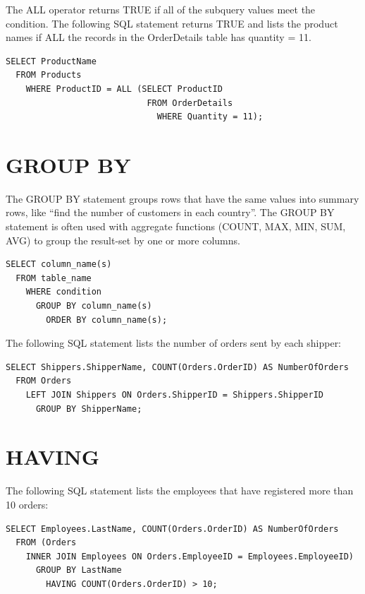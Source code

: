 \documentclass[
]{book}
\begin{document}
The ALL operator returns TRUE if all of the subquery values meet the condition. The following SQL statement returns TRUE and lists the product names if ALL the records in the OrderDetails table has quantity = 11.

\begin{verbatim}
SELECT ProductName
  FROM Products
    WHERE ProductID = ALL (SELECT ProductID 
                            FROM OrderDetails 
                              WHERE Quantity = 11);
\end{verbatim}

\hypertarget{group-by}{%
\section{GROUP BY}\label{group-by}}

The GROUP BY statement groups rows that have the same values into summary rows, like ``find the number of customers in each country''. The GROUP BY statement is often used with aggregate functions (COUNT, MAX, MIN, SUM, AVG) to group the result-set by one or more columns.

\begin{verbatim}
SELECT column_name(s)
  FROM table_name
    WHERE condition
      GROUP BY column_name(s)
        ORDER BY column_name(s);
\end{verbatim}

The following SQL statement lists the number of orders sent by each shipper:

\begin{verbatim}
SELECT Shippers.ShipperName, COUNT(Orders.OrderID) AS NumberOfOrders 
  FROM Orders
    LEFT JOIN Shippers ON Orders.ShipperID = Shippers.ShipperID
      GROUP BY ShipperName;
\end{verbatim}

\hypertarget{having-1}{%
\section{HAVING}\label{having-1}}

The following SQL statement lists the employees that have registered more than 10 orders:

\begin{verbatim}
SELECT Employees.LastName, COUNT(Orders.OrderID) AS NumberOfOrders
  FROM (Orders
    INNER JOIN Employees ON Orders.EmployeeID = Employees.EmployeeID)
      GROUP BY LastName
        HAVING COUNT(Orders.OrderID) > 10;
\end{verbatim}
\end{document}

